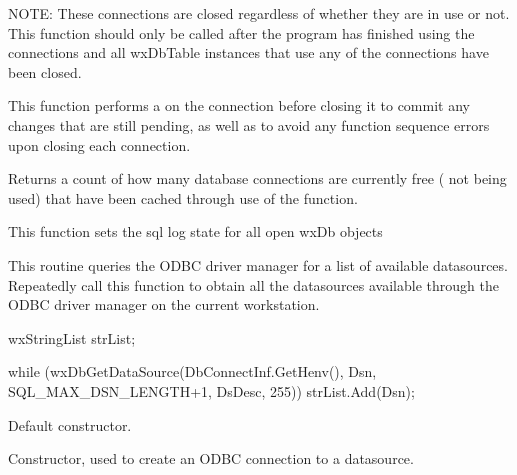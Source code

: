 NOTE: These connections are closed regardless of whether they are in use 
or not.  This function should only be called after the program has 
finished using the connections and all wxDbTable instances that use any of 
the connections have been closed.

This function performs a  
on the connection before closing it to commit any changes that are still 
pending, as well as to avoid any function sequence errors upon closing 
each connection.




Returns a count of how many database connections are currently free ( not 
being used) that have been cached through use of the  
function.




This function sets the sql log state for all open wxDb objects




This routine queries the ODBC driver manager for a list of available 
datasources.  Repeatedly call this function to obtain all the datasources 
available through the ODBC driver manager on the current workstation.

    wxStringList strList;

    while (wxDbGetDataSource(DbConnectInf.GetHenv(), Dsn, SQL_MAX_DSN_LENGTH+1, DsDesc, 255))
        strList.Add(Dsn);



\label{wxdbconstr}


Default constructor.


Constructor, used to create an ODBC connection to a datasource.


